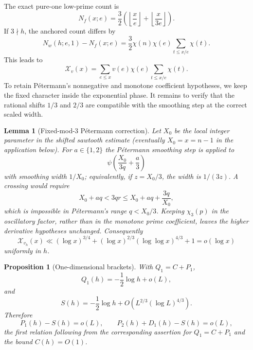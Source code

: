 \documentclass[11pt]{article}
\newtheorem{proposition}[proposition]{Proposition}
\newtheorem{lemma}[lemma]{Lemma}
\theoremstyle{definition}
\theoremstyle{remark}
\newcommand{\Xcal}{\mathcal X}
\newcommand{\1}{\mathbf 1}
\newcommand{\llog}{\log\log}
\begin{document}
The exact pure-one low-prime count is
\begin{equation}\label{eq:free-low-count}
N_f(x;e)=\frac32\left(\left\lfloor\frac xe\right\rfloor+
                    \left\lfloor\frac{x}{3e}\right\rfloor\right).
\end{equation}
If $3\nmid h$, the anchored count differs by
\begin{equation}\label{eq:character-correction}
N_w(h;e,1)-N_f(x;e)
 =\frac32\chi(n)\chi(e)\sum_{t\le x/e}\chi(t).
\end{equation}
This leads to
\[
\Xcal_v(x)=\sum_{e\le x}v(e)\chi(e)\sum_{t\le x/e}\chi(t).
\]
To retain P\'etermann's nonnegative and monotone coefficient hypotheses, we keep the fixed character inside the exponential phase.  It remains to verify that the rational shifts $1/3$ and $2/3$ are compatible with the smoothing step at the correct scaled width.

\begin{lemma}[Fixed-mod-$3$ P\'etermann correction]\label{lem:mod3-petermann}
Let $X_0$ be the local integer parameter in the shifted sawtooth estimate
(eventually $X_0=x=n-1$ in the application below).  For $a\in\{1,2\}$ the
P\'etermann smoothing step is applied to
\begin{equation}\label{eq:mod3-smoothing}
\boxed{\psi\!\left(\frac{X_0}{3q}+\frac a3\right)}
\end{equation}
with smoothing width $1/X_0$; equivalently, if $z=X_0/3$, the width is
$1/(3z)$.  A crossing would require
\begin{equation}\label{eq:no-crossing}
X_0+aq<3qr\le X_0+aq+\frac{3q}{X_0},
\end{equation}
which is impossible in P\'etermann's range $q<X_0/3$.  Keeping $\chi_3(p)$ in the oscillatory factor, rather than in the monotone prime coefficient, leaves the higher derivative hypotheses unchanged.  Consequently
\begin{equation}\label{eq:mod3-bound}
\Xcal_{v_h}(x)
 \ll (\log x)^{3/4}
     +(\log x)^{2/3}(\llog x)^{4/3}+1
 =o(\log x)
\end{equation}
uniformly in $h$.
\end{lemma}

\begin{proposition}[One-dimensional brackets]\label{prop:one-dimensional}
With $Q_1=C+P_1$,
\begin{equation}\label{eq:Q1-asymptotic}
Q_1(h)=-\frac12\log h+o(L),
\end{equation}
and
\begin{equation}\label{eq:S-asymptotic}
S(h)=-\frac12\log h
 +O\!\left(L^{2/3}(\log L)^{4/3}\right).
\end{equation}
Therefore
\begin{equation}\label{eq:one-d-brackets}
P_1(h)-S(h)=o(L),\qquad
P_2(h)+D_1(h)-S(h)=o(L),
\end{equation}
the first relation following from the corresponding assertion for $Q_1=C+P_1$ and the bound $C(h)=O(1)$.
\end{proposition}
\end{document}
